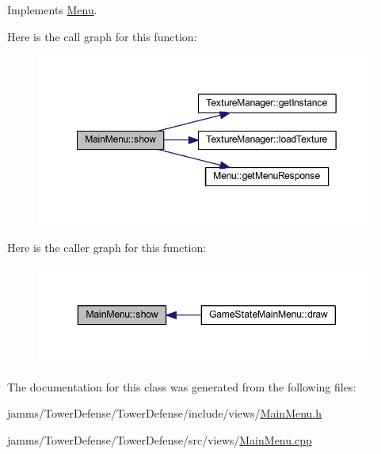Implements \hyperlink{class_menu_a36605c91aee63d4be6a85b3911a7725b}{Menu}.



Here is the call graph for this function\+:\nopagebreak
\begin{figure}[H]
\begin{center}
\leavevmode
\includegraphics[width=349pt]{class_main_menu_a4d84c0a0b817cbff4faf67274dadcc1c_cgraph}
\end{center}
\end{figure}




Here is the caller graph for this function\+:\nopagebreak
\begin{figure}[H]
\begin{center}
\leavevmode
\includegraphics[width=343pt]{class_main_menu_a4d84c0a0b817cbff4faf67274dadcc1c_icgraph}
\end{center}
\end{figure}




The documentation for this class was generated from the following files\+:\begin{DoxyCompactItemize}
\item 
jamms/\+Tower\+Defense/\+Tower\+Defense/include/views/\hyperlink{_main_menu_8h}{Main\+Menu.\+h}\item 
jamms/\+Tower\+Defense/\+Tower\+Defense/src/views/\hyperlink{_main_menu_8cpp}{Main\+Menu.\+cpp}\end{DoxyCompactItemize}
